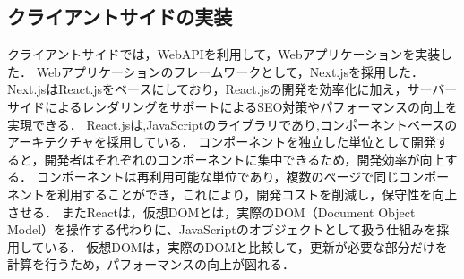 

\subsection{クライアントサイドの実装}\label{4.1.2}
クライアントサイドでは，WebAPIを利用して，Webアプリケーションを実装した．
Webアプリケーションのフレームワークとして，Next.jsを採用した．
Next.jsはReact.jsをベースにしており，React.jsの開発を効率化に加え，サーバーサイドによるレンダリングをサポートによるSEO対策やパフォーマンスの向上を実現できる．
React.jsは,JavaScriptのライブラリであり,コンポーネントベースのアーキテクチャを採用している．
コンポーネントを独立した単位として開発すると，開発者はそれぞれのコンポーネントに集中できるため，開発効率が向上する．
コンポーネントは再利用可能な単位であり，複数のページで同じコンポーネントを利用することができ，これにより，開発コストを削減し，保守性を向上させる．
またReactは，仮想DOMとは，実際のDOM（Document Object Model）を操作する代わりに、JavaScriptのオブジェクトとして扱う仕組みを採用している．
仮想DOMは，実際のDOMと比較して，更新が必要な部分だけを計算を行うため，パフォーマンスの向上が図れる．












